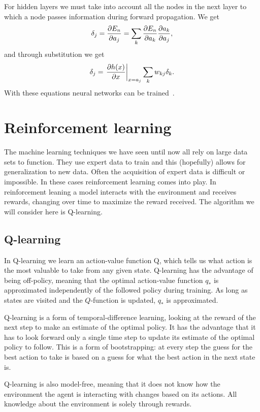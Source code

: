 \documentclass[11pt, a4paper]{report} %
\begin{document}
For hidden layers we must take into account all the nodes in the next layer to which a node passes information during forward propagation.
We get
\begin{align}
  \label{eq:70}
  \delta_j = \pdv{E_n}{a_j} = \sum_k\pdv{E_n}{a_k}\pdv{a_k}{a_j},
\end{align}
and through substitution we get
\begin{align}
  \label{eq:72}
  \delta_j = \eval{\pdv{h(x)}{x}}_{x=a_j} \sum_k w_{kj} \delta_k.
\end{align}
With these equations neural networks can be trained~\cite{Bishop2006}.


\section{Reinforcement learning}


The machine learning techniques we have seen until now all rely on large data sets to function.
They use expert data to train and this (hopefully) allows for generalization to new data.
Often the acquisition of expert data is difficult or impossible.
In these cases reinforcement learning comes into play.
In reinforcement leaning a model interacts with the environment and receives rewards, changing over time to maximize the reward received.
The algorithm we will consider here is Q-learning.

\subsection{Q-learning}

In Q-learning we learn an action-value function Q, which tells us what action is the most valuable to take from any given state.
Q-learning has the advantage of being off-policy, meaning that the optimal action-value function \(q_*\) is approximated independently of the followed policy during training.
As long as states are visited and the \(Q\)-function is updated, \(q_*\) is approximated.

Q-learning is a form of temporal-difference learning, looking at the reward of the next step to make an estimate of the optimal policy.
It has the advantage that it has to look forward only a single time step to update its estimate of the optimal policy to follow.
This is a form of bootstrapping: at every step the guess for the best action to take is based on a guess for what the best action in the next state is.

Q-learning is also model-free, meaning that it does not know how the environment the agent is interacting with changes based on its actions.
All knowledge about the environment is solely through rewards.
\end{document}
